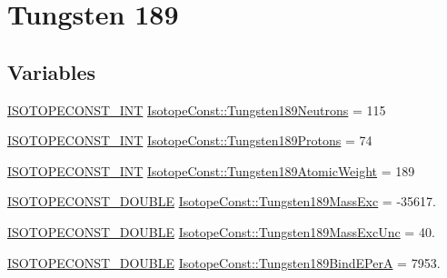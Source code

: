 \hypertarget{group___isotope_const-_tungsten-_w189}{}\section{Tungsten 189}
\label{group___isotope_const-_tungsten-_w189}
\subsection*{Variables}
\begin{DoxyCompactItemize}
\item 
\mbox{\hyperlink{group___isotope_const-_macros_ga5f18360b3e99483a35c32d789e62621c}{I\+S\+O\+T\+O\+P\+E\+C\+O\+N\+S\+T\+\_\+\+I\+NT}} \mbox{\hyperlink{group___isotope_const-_tungsten-_w189_ga937c963fb18a48c67e69a498aa0aebb5}{Isotope\+Const\+::\+Tungsten189\+Neutrons}} = 115
\item 
\mbox{\hyperlink{group___isotope_const-_macros_ga5f18360b3e99483a35c32d789e62621c}{I\+S\+O\+T\+O\+P\+E\+C\+O\+N\+S\+T\+\_\+\+I\+NT}} \mbox{\hyperlink{group___isotope_const-_tungsten-_w189_gae5b0279b39a38fce13b7021390608cd4}{Isotope\+Const\+::\+Tungsten189\+Protons}} = 74
\item 
\mbox{\hyperlink{group___isotope_const-_macros_ga5f18360b3e99483a35c32d789e62621c}{I\+S\+O\+T\+O\+P\+E\+C\+O\+N\+S\+T\+\_\+\+I\+NT}} \mbox{\hyperlink{group___isotope_const-_tungsten-_w189_ga7bc2c4241c3ed407c5dce46998fd301d}{Isotope\+Const\+::\+Tungsten189\+Atomic\+Weight}} = 189
\item 
\mbox{\hyperlink{group___isotope_const-_macros_ga8f45a7272ce02c0b4c65c44636ed719a}{I\+S\+O\+T\+O\+P\+E\+C\+O\+N\+S\+T\+\_\+\+D\+O\+U\+B\+LE}} \mbox{\hyperlink{group___isotope_const-_tungsten-_w189_gab31a2ddf03adfc33dc97c68ce67f6a46}{Isotope\+Const\+::\+Tungsten189\+Mass\+Exc}} = -\/35617.
\item 
\mbox{\hyperlink{group___isotope_const-_macros_ga8f45a7272ce02c0b4c65c44636ed719a}{I\+S\+O\+T\+O\+P\+E\+C\+O\+N\+S\+T\+\_\+\+D\+O\+U\+B\+LE}} \mbox{\hyperlink{group___isotope_const-_tungsten-_w189_ga8f037f52ee12ba547a8a5d4b990f9790}{Isotope\+Const\+::\+Tungsten189\+Mass\+Exc\+Unc}} = 40.
\item 
\mbox{\hyperlink{group___isotope_const-_macros_ga8f45a7272ce02c0b4c65c44636ed719a}{I\+S\+O\+T\+O\+P\+E\+C\+O\+N\+S\+T\+\_\+\+D\+O\+U\+B\+LE}} \mbox{\hyperlink{group___isotope_const-_tungsten-_w189_ga8ac4a42182577bf3eb1369bcfdc48dc5}{Isotope\+Const\+::\+Tungsten189\+Bind\+E\+PerA}} = 7953.
\item 

\end{DoxyCompactItemize}
